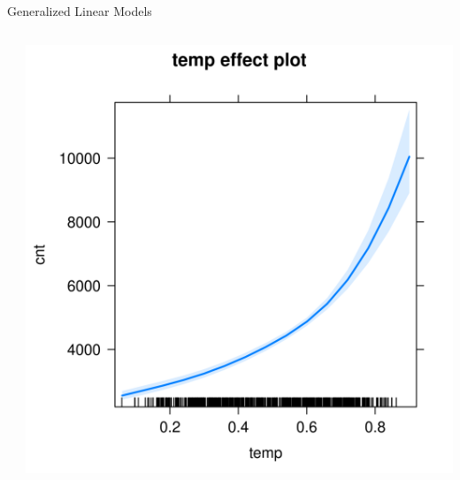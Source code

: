 \documentclass[11pt,compress,t,notes=noshow, aspectratio=169, xcolor=table]{beamer}
\begin{document}
\begin{frame}{Generalized Linear Models}
\begin{columns}[T]
\begin{column}{0.55\textwidth}
\tiny

\end{column}
\begin{column}{0.45\textwidth}  %
  \includegraphics[width = \textwidth]{figure/glm_effect_plot.png}
\end{column}
\end{columns}
\end{frame}
\end{document}
